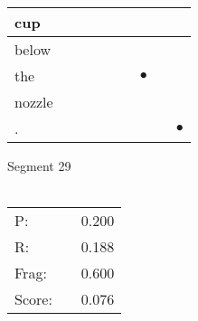\documentclass[landscape]{article}
\newcommand{\ssp}{\hspace{2pt}}
\newcommand{\mex}{\cellcolor{g}$\bullet$}
\begin{document}
\begin{tabular}{|l|p{10pt}|p{10pt}|p{10pt}|p{10pt}|p{10pt}|p{10pt}|p{10pt}|p{10pt}|}
\hline
\ssp cup \ssp&\hspace{2pt}&\hspace{2pt}&\hspace{2pt}&\hspace{2pt}&\hspace{2pt}&\hspace{2pt}&\hspace{2pt}&\hspace{2pt}\\
\hline
\ssp below \ssp&\hspace{2pt}&\hspace{2pt}&\hspace{2pt}&\hspace{2pt}&\hspace{2pt}&\hspace{2pt}&\hspace{2pt}&\hspace{2pt}\\
\hline
\ssp \cellcolor{ref5}the \ssp&\hspace{2pt}&\hspace{2pt}&\hspace{2pt}&\hspace{2pt}&\hspace{2pt}&\hspace{2pt}\mex&\hspace{2pt}&\hspace{2pt}\\
\hline
\ssp nozzle \ssp&\hspace{2pt}&\hspace{2pt}&\hspace{2pt}&\hspace{2pt}&\hspace{2pt}&\hspace{2pt}&\hspace{2pt}&\hspace{2pt}\\
\hline
\ssp \cellcolor{ref7}. \ssp&\hspace{2pt}&\hspace{2pt}&\hspace{2pt}&\hspace{2pt}&\hspace{2pt}&\hspace{2pt}&\hspace{2pt}&\hspace{2pt}\mex\\
\hline
\end{tabular}

\vspace{6pt}
\noindent Segment 29\\\\
\noindent\begin{tabular}{lm{12pt}r}
\hline
P:&&0.200\\
R:&&0.188\\
Frag:&&0.600\\
Score:&&0.076\\
\end{tabular}
\end{document}
